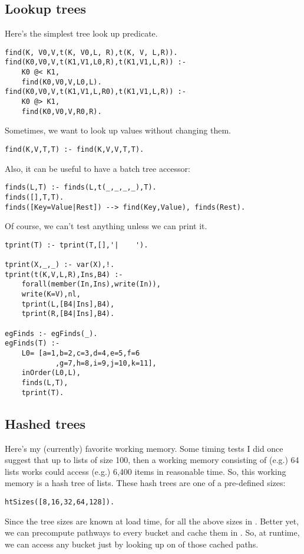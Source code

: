 \subsection{ Lookup trees
}
\label{sec:lookuptables}
Here's the simplest tree look up predicate.
\begin{Verbatim}
find(K, V0,V,t(K, V0,L, R),t(K, V, L,R)).
find(K0,V0,V,t(K1,V1,L0,R),t(K1,V1,L,R)) :-
	K0 @< K1,
	find(K0,V0,V,L0,L).
find(K0,V0,V,t(K1,V1,L,R0),t(K1,V1,L,R)) :-
	K0 @> K1,
	find(K0,V0,V,R0,R).
\end{Verbatim}
Sometimes, we want to look up values without
changing them.
\begin{Verbatim}
find(K,V,T,T) :- find(K,V,V,T,T).
\end{Verbatim}
Also, it can be useful to have a batch tree accessor:
\begin{Verbatim}
finds(L,T) :- finds(L,t(_,_,_,_),T).
finds([],T,T).
finds([Key=Value|Rest]) --> find(Key,Value), finds(Rest).
\end{Verbatim}
Of course, we can't test anything unless we can
print it.
\begin{Verbatim}
tprint(T) :- tprint(T,[],'|    ').

tprint(X,_,_) :- var(X),!.
tprint(t(K,V,L,R),Ins,B4) :-
	forall(member(In,Ins),write(In)),
	write(K=V),nl,
	tprint(L,[B4|Ins],B4),
	tprint(R,[B4|Ins],B4).

egFinds :- egFinds(_).
egFinds(T) :-
	L0= [a=1,b=2,c=3,d=4,e=5,f=6
            ,g=7,h=8,i=9,j=10,k=11],
	inOrder(L0,L),
	finds(L,T),
	tprint(T).
\end{Verbatim}
\subsection{ Hashed trees
}
Here's my (currently) favorite working memory.
%
Some timing tests I did once suggest that up to lists
of size 100, then a working memory consisting of (e.g.) 64
lists
works could access (e.g.) 6,400 items in reasonable time.
%
So, this working memory is a hash tree of lists.
These hash trees are one of a pre-defined sizes:
\begin{Verbatim}
htSizes([8,16,32,64,128]).
\end{Verbatim}
Since the tree sizes are known at load time,
for all the above sizes in .
Better yet, we can precompute pathways to every
bucket and cache them  in .
So, at runtime, we can access any bucket just by
looking up on of those cached paths.
